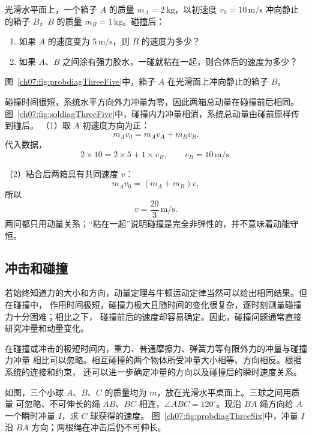 {
\begin{origexamplebox}{}\label{ch07:ex:s07-3-5}
光滑水平面上，一个箱子 $A$ 的质量 $m_A=2\,\mathrm{kg}$，以初速度
$v_0=10\,\mathrm{m/s}$ 冲向静止的箱子 $B$，$B$ 的质量 $m_B=1\,\mathrm{kg}$。碰撞后：
\begin{enumerate}[label=\arabic*.,leftmargin=2.2em]
 \item 如果 $A$ 的速度变为 $5\,\mathrm{m/s}$，则 $B$ 的速度为多少？
 \item 如果 $A$、$B$ 之间涂有强力胶水，一碰就粘在一起，则合体后的速度为多少？
\end{enumerate}
图~\ref{ch07:fig:probdiagThreeFive}中，箱子 $A$ 在光滑面上冲向静止的箱子 $B$。
\probdiagThreeFive
\end{origexamplebox}

\begin{xesolution}
碰撞时间很短，系统水平方向外力冲量为零，因此两箱总动量在碰撞前后相同。
图~\ref{ch07:fig:soldiagThreeFive}中，碰撞内力冲量相消，系统总动量由碰前原样传到碰后。
\soldiagThreeFive
（1）取 $A$ 初速度方向为正：
\[
 m_Av_0=m_Av_A+m_Bv_B.
\]
代入数据，
\[
 2\times10=2\times5+1\times v_B,
 \qquad
 \boxed{v_B=10\,\mathrm{m/s}}.
\]

（2）粘合后两箱具有共同速度 $v$：
\[
 m_Av_0=(m_A+m_B)v,
\]
所以
\[
 \boxed{v=\frac{20}{3}\,\mathrm{m/s}}.
\]
两问都只用动量关系；“粘在一起”说明碰撞是完全非弹性的，并不意味着动能守恒。
\end{xesolution}

\subsection{冲击和碰撞}

若始终知道力的大小和方向，动量定理与牛顿运动定律当然可以给出相同结果。但在碰撞中，
作用时间极短，碰撞力极大且随时间的变化很复杂，逐时刻测量碰撞力十分困难；相比之下，
碰撞前后的速度却容易确定。因此，碰撞问题通常直接研究冲量和动量变化。

在碰撞或冲击的极短时间内，重力、普通摩擦力、弹簧力等有限外力的冲量与碰撞力冲量
相比可以忽略。相互碰撞的两个物体所受冲量大小相等、方向相反。根据系统的连接和约束，
还可以进一步确定冲量的方向以及碰撞后的瞬时速度关系。

\begin{origexamplebox}{}\label{ch07:ex:s07-3-6}
如图，三个小球 $A$、$B$、$C$ 的质量均为 $m$，放在光滑水平桌面上。三球之间用质量
可忽略、不可伸长的绳 $AB$、$BC$ 相连，$\angle ABC=120^\circ$。现沿 $BA$ 绳方向给
$A$ 一个瞬时冲量 $I$，求 $C$ 球获得的速度。
图~\ref{ch07:fig:probdiagThreeSix}中，冲量 $I$ 沿 $BA$ 方向；两根绳在冲击后仍不可伸长。
\probdiagThreeSix
\end{origexamplebox}

}
